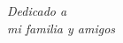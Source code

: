 \documentclass[a4paper, 12pt]{book}
\begin{document}
	\newpage
	\mbox{}
	\thispagestyle{empty} %
	
	
%	
%		
%		
%		
%		
%	
%	
%	
%	
%	
%	
%	
%	
%	
%	
	
	\chapter*{}
	\begin{flushright}
		\textit{Dedicado a \\
			mi familia y amigos}
	\end{flushright}
	
\end{document}
